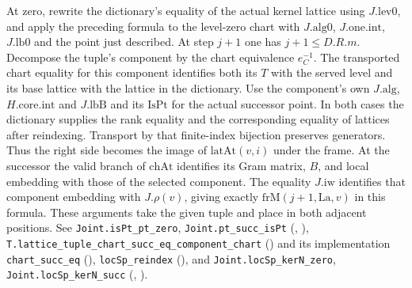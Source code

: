 At zero, rewrite the dictionary's equality of the actual kernel lattice
using $J.\mathrm{lev0}$, and apply the preceding formula to the
level-zero chart with $J.\mathrm{alg0}$, $J.\mathrm{one.int}$,
$J.\mathrm{lb0}$ and the point just described. At step $j+1$ one has
$j+1\le D.R.m$. Decompose the tuple's component by the chart equivalence
$e_C^{-1}$. The transported chart equality for this component identifies
both its $T$ with the served level and its base lattice with the lattice
in the dictionary. Use the component's own
$J.\mathrm{alg}$, $H.\mathrm{core.int}$ and $J.\mathrm{lbB}$ and its
$\mathrm{IsPt}$ for the actual successor point. In both cases the
dictionary supplies the rank equality and the corresponding equality
of lattices after reindexing. Transport by that finite-index bijection
preserves generators. Thus the right side becomes the image of
$\mathrm{latAt}(v,i)$ under the frame. At the successor the valid branch
of $\mathrm{chAt}$ identifies its Gram matrix, $B$, and local embedding
with those of the selected component. The equality $J.\mathrm{iw}$
identifies that component embedding with $J.\rho(v)$, giving exactly
$\mathrm{frM}(j+1,\mathrm{La},v)$ in this formula. These arguments take
the given tuple and place in both adjacent positions. See
\nolinkurl{Joint.isPt_pt_zero}, \nolinkurl{Joint.pt_succ_isPt}
(,
),
\nolinkurl{T.lattice_tuple_chart_succ_eq_component_chart}
()
and its implementation \nolinkurl{chart_succ_eq}
(),
\nolinkurl{locSp_reindex} (),
and \nolinkurl{Joint.locSp_kerN_zero}, \nolinkurl{Joint.locSp_kerN_succ}
(,
).

